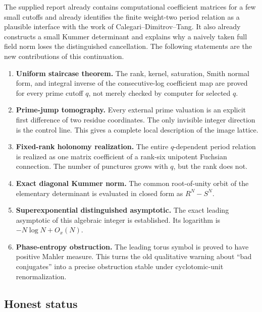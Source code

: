 \documentclass[11pt]{article}
\theoremstyle{definition}
\theoremstyle{remark}
\begin{document}
The supplied report already contains computational coefficient matrices for a
few small cutoffs and already identifies the finite weight-two period relation as
a plausible interface with the work of Calegari--Dimitrov--Tang.  It also already
constructs a small Kummer determinant and explains why a naively taken full field
norm loses the distinguished cancellation.  The following statements are the
new contributions of this continuation.

\begin{enumerate}[label=\textbf{N\arabic*.},leftmargin=3.6em]
\item \textbf{Uniform staircase theorem.}  The rank, kernel, saturation, Smith
normal form, and integral inverse of the consecutive-log coefficient map are
proved for every prime cutoff $q$, not merely checked by computer for selected
$q$.

\item \textbf{Prime-jump tomography.}  Every external prime valuation is an
explicit first difference of two residue coordinates.  The only invisible
integer direction is the control line.  This gives a complete local description
of the image lattice.

\item \textbf{Fixed-rank holonomy realization.}  The entire $q$-dependent
period relation is realized as one matrix coefficient of a rank-six unipotent
Fuchsian connection.  The number of punctures grows with $q$, but the rank does
not.

\item \textbf{Exact diagonal Kummer norm.}  The common root-of-unity orbit of
the elementary determinant is evaluated in closed form as $R^N-S^N$.

\item \textbf{Superexponential distinguished asymptotic.}  The exact leading
asymptotic of this algebraic integer is established.  Its logarithm is
$-N\log N+O_x(N)$.

\item \textbf{Phase-entropy obstruction.}  The leading torus symbol is proved
to have positive Mahler measure.  This turns the old qualitative warning about
``bad conjugates'' into a precise obstruction stable under cyclotomic-unit
renormalization.
\end{enumerate}

\subsection{Honest status}
\end{document}
